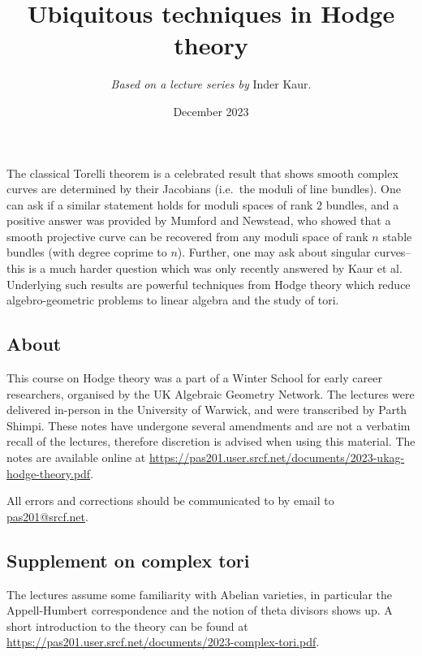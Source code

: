\title{Ubiquitous techniques in Hodge theory}
\author{\textit{Based on a lecture series by }Inder Kaur.}
\date{December 2023}
\maketitle

\newcommand{\Jac}{\mathop{\mathcal{J\kern -0.5pt a\kern -0.5pt c\kern -1pt}}}
\newcommand{\IJac}{\mathop{I\mathcal{J\kern -0.5pt a\kern -0.5pt c\kern -1pt}}}
\newcommand{\Moduli}{\ensuremath{\mathscr{M}}}

The classical Torelli theorem is a celebrated result that shows smooth complex
curves are determined by their Jacobians (i.e.\ the moduli of line bundles). One
can ask if a similar statement holds for moduli spaces of rank \(2\) bundles,
and a positive answer was provided by Mumford and Newstead, who showed that
a smooth projective curve can be recovered from any moduli space of rank \(n\)
stable bundles (with degree coprime to \(n\)). Further, one may ask about
singular curves-- this is a much harder question which was only recently
answered by Kaur et al. Underlying such results are powerful techniques from
Hodge theory which reduce algebro-geometric problems to linear algebra and the
study of tori.

\subsection{About} This course on Hodge theory was a part of a Winter School
for early career researchers, organised by the UK Algebraic
Geometry Network. The lectures were delivered in-person in
the University of Warwick, and were transcribed by Parth Shimpi. These
notes have undergone several amendments and are not a verbatim recall of
the lectures, therefore discretion is advised when using this material. The
notes are available online at
\url{https://pas201.user.srcf.net/documents/2023-ukag-hodge-theory.pdf}. 

All
errors and corrections should be communicated to by email to
\url{pas201@srcf.net}.

\subsection{Supplement on complex tori} The lectures assume some familiarity
with Abelian varieties, in particular the Appell-Humbert correspondence and the
notion of theta divisors shows up. A short introduction to the theory can be found at \url{https://pas201.user.srcf.net/documents/2023-complex-tori.pdf}.

